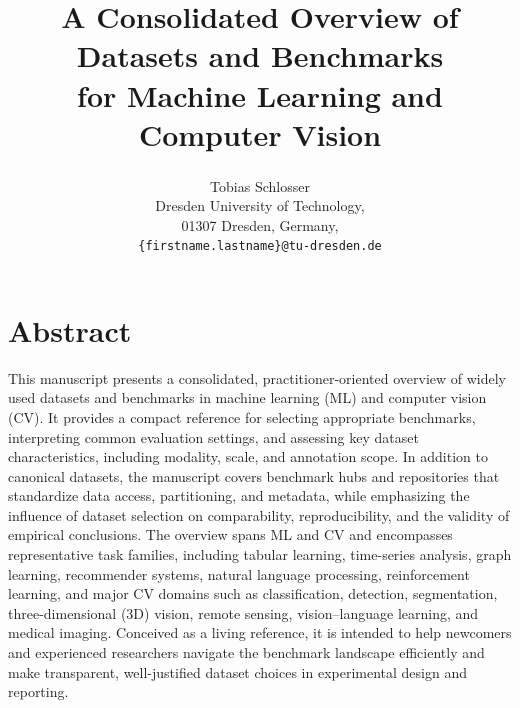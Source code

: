 \documentclass{article}
\newcommand{\ORCID}[1]{\textsuperscript{\href{https://orcid.org/#1}{\textcolor[HTML]{A6CE39}{\faOrcid}}}}
\newcommand{\ORCIDSchlosser}{0000-0002-0682-4284} %
\begin{document}
\title{\Huge A Consolidated Overview of \\ Datasets and Benchmarks \\ for Machine Learning and Computer Vision}

\author{
    Tobias Schlosser\ORCID{\ORCIDSchlosser} \\[1ex]
    Dresden University of Technology, \\
    01307 Dresden, Germany, \\
    \texttt{\{firstname.lastname\}@tu-dresden.de}
}




\maketitle




\section*{Abstract}

This manuscript presents a consolidated, practitioner-oriented overview of widely used datasets and benchmarks in machine learning (ML) and computer vision (CV). It provides a compact reference for selecting appropriate benchmarks, interpreting common evaluation settings, and assessing key dataset characteristics, including modality, scale, and annotation scope. In addition to canonical datasets, the manuscript covers benchmark hubs and repositories that standardize data access, partitioning, and metadata, while emphasizing the influence of dataset selection on comparability, reproducibility, and the validity of empirical conclusions. The overview spans ML and CV and encompasses representative task families, including tabular learning, time-series analysis, graph learning, recommender systems, natural language processing, reinforcement learning, and major CV domains such as classification, detection, segmentation, three-dimensional (3D) vision, remote sensing, vision--language learning, and medical imaging. Conceived as a living reference, it is intended to help newcomers and experienced researchers navigate the benchmark landscape efficiently and make transparent, well-justified dataset choices in experimental design and reporting.
\end{document}
